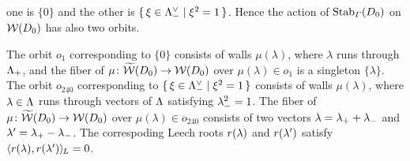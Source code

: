 \documentclass{amsart} %
\begin{document}
one is 
$\{0\}$ and the other is $\{\,{\xi\in \Lambda_{-}^{\vee}}\mid {\xi^2=1} \,\}$.
Hence the action of $\operatorname{Stab}_{\varGamma}(D_0)$ on $\mathord{\mathcal{W}}(D_0)$ 
has also two orbits.
\par
The orbit $o_1$ corresponding to $\{0\}$
consists of walls $\mu(\lambda)$,
where $\lambda$ runs through $\Lambda_{+}$,
and the fiber of $\mu\colon \widetilde{\mathord{\mathcal{W}}}(D_0)\to\mathord{\mathcal{W}}(D_0)$ 
over $\mu(\lambda)\in o_1$ is a singleton $\{\lambda\}$.
The orbit $o_{240}$ corresponding to $\{\,{\xi\in \Lambda_{-}^{\vee}}\mid {\xi^2=1} \,\}$
consists of walls $\mu(\lambda)$,
where $\lambda\in \Lambda$ runs through
vectors of $\Lambda$ satisfying ${\lambda}_{-}^2=1$.
The fiber of $\mu\colon \widetilde{\mathord{\mathcal{W}}}(D_0)\to\mathord{\mathcal{W}}(D_0)$ 
over $\mu(\lambda)\in o_{240}$ consists 
of two vectors
$\lambda={\lambda}_{+}+{\lambda}_{-}$ and $\lambda^{\prime}={\lambda}_{+}-{\lambda}_{-}$.
The correspoding Leech roots 
$r(\lambda)$ and $r(\lambda^{\prime})$ satisfy
$\langle r(\lambda), r(\lambda^{\prime}) \rangle_{\hskip -1pt L}=0$.
%
%
\end{document}
